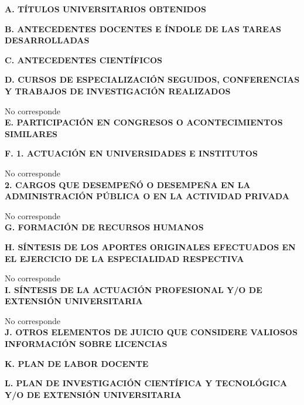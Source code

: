 \documentclass{article}
\newcommand{\titulosec}[1]{\textbf{\textsf{\MakeUppercase{#1}}}}
\begin{document}
\noindent \titulosec{A. Títulos universitarios obtenidos}



\noindent \titulosec{B. Antecedentes docentes e índole de las tareas desarrolladas}



\noindent \titulosec{C. Antecedentes científicos}



\noindent \titulosec{D. Cursos de especialización seguidos, conferencias y trabajos de investigación realizados}

No corresponde \\

\noindent \titulosec{E. Participación en congresos o acontecimientos similares}



\noindent \titulosec{F. 1. Actuación en universidades e institutos}

No corresponde \\

\titulosec{2. Cargos que desempeñó o desempeña en la administración pública o en la actividad privada}

No corresponde \\

\noindent \titulosec{G. formación de recursos humanos}



\noindent \titulosec{H. Síntesis de los aportes originales efectuados en el ejercicio de la especialidad respectiva}

No corresponde \\

\noindent \titulosec{I. Síntesis de la actuación profesional y/o de extensión universitaria}

No corresponde \\

\noindent \titulosec{J. Otros elementos de juicio que considere valiosos} \\

\titulosec{Información sobre licencias}

\licencias

\noindent \titulosec{K. Plan de labor docente}



\noindent \titulosec{L. Plan de investigación científica y tecnológica y/o de extensión universitaria}
\end{document}
